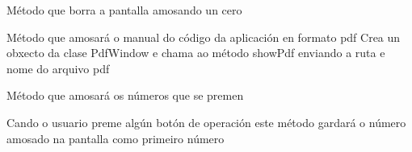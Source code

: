 \documentclass[letterpaper,10pt,spanish]{sphinxmanual}
\begin{document}
\begin{fulllineitems}
\begin{fulllineitems}
\end{fulllineitems}


\begin{fulllineitems}
\label{\detokenize{api/modulos:calculadora_infantil.CalculinhaApp.limpa_display}}
\sphinxAtStartPar
Método que borra a pantalla amosando un cero

\end{fulllineitems}


\begin{fulllineitems}
\label{\detokenize{api/modulos:calculadora_infantil.CalculinhaApp.manual_app}}
\sphinxAtStartPar
Método que amosará o manual do código da aplicación en formato pdf
Crea un obxecto da clase PdfWindow e chama ao método showPdf
enviando a ruta e nome do arquivo pdf

\end{fulllineitems}


\begin{fulllineitems}
\label{\detokenize{api/modulos:calculadora_infantil.CalculinhaApp.preme_num}}
\sphinxAtStartPar
Método que amosará os números que se premen

\end{fulllineitems}


\begin{fulllineitems}
\label{\detokenize{api/modulos:calculadora_infantil.CalculinhaApp.preme_operacion}}
\sphinxAtStartPar
Cando o usuario preme algún botón de operación
este método gardará o número amosado na pantalla como primeiro número


\end{fulllineitems}
\end{fulllineitems}
\end{document}

